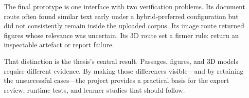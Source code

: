 The final prototype is one interface with two verification problems. Its document route often found similar text early under a hybrid-preferred configuration but did not consistently remain inside the uploaded corpus. Its image route returned figures whose relevance was uncertain. Its 3D route set a firmer rule: return an inspectable artefact or report failure.

That distinction is the thesis's central result. Passages, figures, and 3D models require different evidence. By making those differences visible---and by retaining the unsuccessful cases---the project provides a practical basis for the expert review, runtime tests, and learner studies that should follow.
